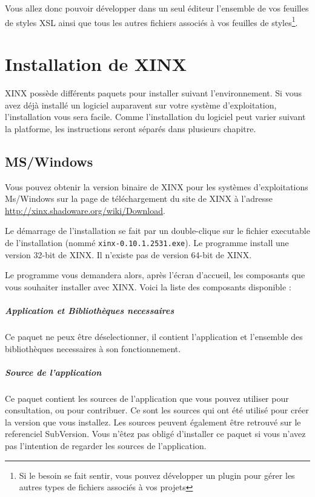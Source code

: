 \documentclass[a4paper,10pt,twoside]{book}
\begin{document}
Vous allez donc pouvoir développer dans un seul éditeur l'ensemble de vos feuilles de styles XSL ainsi que tous les autres fichiers associés à vos feuilles de styles\footnote{Si le besoin se fait sentir, vous pouvez développer un plugin pour gérer les autres types de fichiers associés à vos projets}.



\chapter{Installation de XINX}

XINX possède différents paquets pour installer suivant l'environnement. Si vous avez déjà installé un logiciel auparavent sur votre système d'exploitation, l'installation vous sera facile. Comme l'installation du logiciel peut varier suivant la platforme, les instructions seront séparés dans plusieurs chapitre.

\section{MS/Windows}

Vous pouvez obtenir la version binaire de XINX pour les systèmes d'exploitations Ms/Windows sur la page de téléchargement du site de XINX à l'adresse \url{http://xinx.shadoware.org/wiki/Download}. 

Le démarrage de l'installation se fait par un double-clique sur le fichier executable de l'installation (nommé \verb+xinx-0.10.1.2531.exe+). Le programme install une version 32-bit de XINX. Il n'existe pas de version 64-bit de XINX.

Le programme vous demandera alors, après l'écran d'accueil, les composants que vous souhaiter installer avec XINX. Voici la liste des composants disponible :

\paragraph{Application et Bibliothèques necessaires} Ce paquet ne peux être déselectionner, il contient l'application et l'ensemble des bibliothèques necessaires à son fonctionnement.
\paragraph{Source de l'application} Ce paquet contient les sources de l'application que vous pouvez utiliser pour consultation, ou pour contribuer. Ce sont les sources qui ont été utilisé pour créer la version que vous installez. Les sources peuvent également être retrouvé sur le referenciel SubVersion. Vous n'êtez pas obligé d'installer ce paquet si vous n'avez pas l'intention de regarder les sources de l'application.
\end{document}
